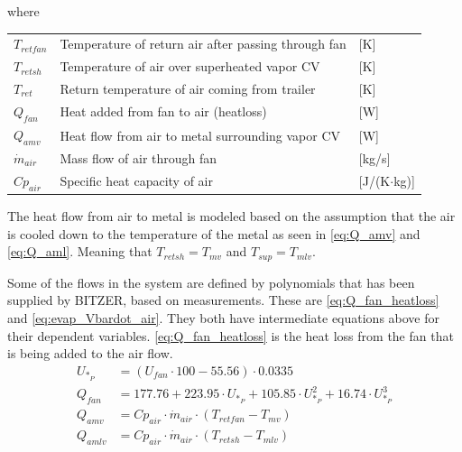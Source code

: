 where

\begin{center}
	\begin{tabular}{l p{10cm} l}
		$T_{retfan}$    & Temperature of return air after passing through fan & [\si{K}]                          \\
		$T_{retsh}$     & Temperature of air over superheated vapor CV        & [\si{K}]                          \\
		$T_{ret}$       & Return temperature of air coming from trailer       & [\si{K}]                          \\
		$Q_{fan}$       & Heat added from fan to air (heatloss)               & [\si{W}]                          \\
		$Q_{amv}$       & Heat flow from air to metal surrounding vapor CV    & [\si{W}]                          \\
		$\dot{m}_{air}$ & Mass flow of air through fan                        & [\si{kg}/\si{s}]                  \\
		$Cp_{air}$      & Specific heat capacity of air                       & [\si{J}/(\si{K}$ \cdot $\si{kg})]
	\end{tabular}
\end{center}

\medskip
The heat flow from air to metal is modeled based on the assumption that the air is cooled down to the temperature of the metal as seen in \cref{eq:Q_amv} and \cref{eq:Q_aml}. Meaning that $T_{retsh} = T_{mv}$ and $T_{sup} = T_{mlv}$.

Some of the flows in the system are defined by polynomials that has been supplied by BITZER, based on measurements. These are \cref{eq:Q_fan_heatloss}  and \cref{eq:evap_Vbardot_air}. They both have intermediate equations above for their dependent variables.
\noindent \cref{eq:Q_fan_heatloss} is the heat loss from the fan that is being added to the air flow. 
\begin{align}
	U_{*_P} & = \left( U_{fan}\cdot 100 - 55.56 \right) \cdot 0.0335  \label{eq:evap_U_star_P}                                       \\
	Q_{fan} & = 177.76 + 223.95 \cdot U_{*_P} + 105.85 \cdot U_{*_P}^2 + 16.74 \cdot U_{*_P}^3	\label{eq:Q_fan_heatloss} \\
	Q_{amv} & = Cp_{air} \cdot \dot{m}_{air} \cdot (T_{retfan} - T_{mv}) 	\label{eq:Q_amv}                                \\
	Q_{amlv} & = Cp_{air} \cdot \dot{m}_{air} \cdot (T_{retsh} - T_{mlv}) 	\label{eq:Q_aml}
\end{align}

